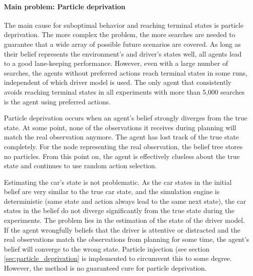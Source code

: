 \paragraph{Main problem: Particle deprivation}

The main cause for suboptimal behavior and reaching terminal states is particle deprivation. The more complex the problem, the more searches are needed to guarantee that a wide array of possible future scenarios are covered. As long as their belief represents the environment's and driver's states well, all agents lead to a good lane-keeping performance. However, even with a large number of searches, the agents without preferred actions reach terminal states in some runs, independent of which driver model is used. The only agent that consistently avoids reaching terminal states in all experiments with more than 5,000 searches is the agent using preferred actions. 

Particle deprivation occurs when an agent's belief strongly diverges from the true state. At some point, none of the observations it receives during planning will match the real observation anymore. The agent has lost track of the true state completely. For the node representing the real observation, the belief tree stores no particles. From this point on, the agent is effectively clueless about the true state and continues to use random action selection.

Estimating the car's state is not problematic. As the car states in the initial belief are very similar to the true car state, and the simulation engine is deterministic (same state and action always lead to the same next state), the car states in the belief do not diverge significantly from the true state during the experiments. The problem lies in the estimation of the state of the driver model. If the agent wrongfully beliefs that the driver is attentive or distracted and the real observations match the observations from planning for some time, the agent's belief will converge to the wrong state. Particle injection (see section \ref{sec:particle_deprivation} is implemented to circumvent this to some degree. However, the method is no guaranteed cure for particle deprivation.

